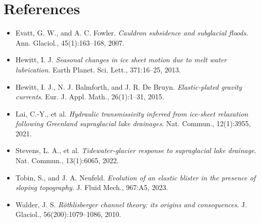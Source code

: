 \documentclass[11pt]{article}
\begin{document}
\section*{References}

\begin{itemize}
\item Evatt, G. W., and A. C. Fowler. \textit{Cauldron subsidence and subglacial floods}. Ann. Glaciol., 45(1):163--168, 2007.

\item Hewitt, I. J. \textit{Seasonal changes in ice sheet motion due to melt water lubrication}. Earth Planet. Sci. Lett., 371:16--25, 2013.

\item Hewitt, I. J., N. J. Balmforth, and J. R. De Bruyn. \textit{Elastic-plated gravity currents}. Eur. J. Appl. Math., 26(1):1--31, 2015.

\item Lai, C.-Y., et al. \textit{Hydraulic transmissivity inferred from ice-sheet relaxation following Greenland supraglacial lake drainages}. Nat. Commun., 12(1):3955, 2021.

\item Stevens, L. A., et al. \textit{Tidewater-glacier response to supraglacial lake drainage}. Nat. Commun., 13(1):6065, 2022.

\item Tobin, S., and J. A. Neufeld. \textit{Evolution of an elastic blister in the presence of sloping topography}. J. Fluid Mech., 967:A5, 2023.

\item Walder, J. S. \textit{R\"othlisberger channel theory: its origins and consequences}. J. Glaciol., 56(200):1079--1086, 2010.
\end{itemize}
\end{document}
